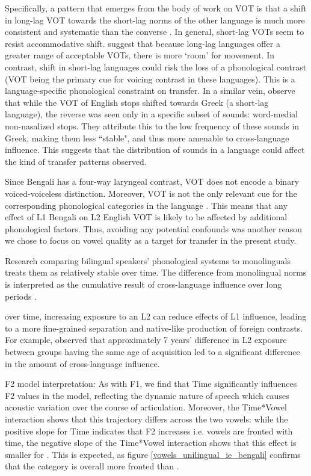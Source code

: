 Specifically, a pattern that emerges from the body of work on VOT is that a shift in long-lag VOT towards the short-lag norms of the other language is much more consistent and systematic than the converse \citep{tobin2017phonetic, olson2016role,bullock2009trying,antoniou2011inter,chang2012rapid}. In general, short-lag VOTs seem to resist accommodative shift. \cite{bullock2009trying} suggest that because long-lag languages offer a greater range of acceptable VOTs, there is more `room' for movement. In contrast, shift in short-lag languages could risk the loss of a phonological contrast (VOT being the primary cue for voicing contrast in these languages).  This is a language-specific phonological constraint on transfer.
In a similar vein, \cite{antoniou2011inter} observe that while the VOT of English stops shifted towards Greek (a short-lag language), the reverse was seen only in a specific subset of sounds: word-medial non-nasalized stops. They attribute this to the low frequency of these sounds in Greek, making them less ``stable", and thus more amenable to cross-language influence. This suggests that the distribution of sounds in a language could affect the kind of transfer patterns observed.


Since Bengali has a four-way laryngeal contrast, VOT does not encode a binary voiced-voiceless distinction. Moreover, VOT is not the only relevant cue for the corresponding phonological categories in the language \citep{dmitrieva2020acoustic}. This means that any effect of L1 Bengali on L2 English VOT is likely to be affected by additional phonological factors. Thus, avoiding any potential confounds was another reason we chose to focus on vowel quality as a target for transfer in the present study. 

Research comparing bilingual speakers' phonological systems to monolinguals treats them as relatively stable over time. The difference from monolingual norms is interpreted as the cumulative result of cross-language influence over long periods \citep[e.g.][]{guion2003vowel, caramazza1973acquisition}. 

over time, increasing exposure to an L2 can reduce effects of L1 influence, leading to a more fine-grained separation and native-like production of foreign contrasts. For example, \cite[][vowel quality]{bohn1992production} 
observed that approximately 7 years' difference in L2 exposure between groups having the same age of acquisition led to a significant difference in the amount of cross-language influence. 

F2 model interpretation:
As with F1, we find that Time significantly influences F2 values in the model, reflecting the dynamic nature of speech which causes acoustic variation over the course of articulation. Moreover, the Time*Vowel interaction shows that this trajectory differs across the two vowels: while the positive slope for Time indicates that F2 increases i.e. vowels are fronted with time, the negative slope of the Time*Vowel interaction shows that this effect is smaller for . This is expected, as figure \ref{vowels_unilingual_ie_bengali} confirms that the category \nt{\ae} is overall more fronted than . 

